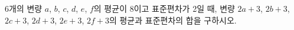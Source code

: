 6개의 변량 $a$, $b$, $c$, $d$, $e$, $f$의 평균이 8이고 표준편차가 2일 때, 변량 $2a+3$, $2b+3$, $2c+3$, $2d+3$, $2e+3$, $2f+3$의 평균과 표준편차의 합을 구하시오.
